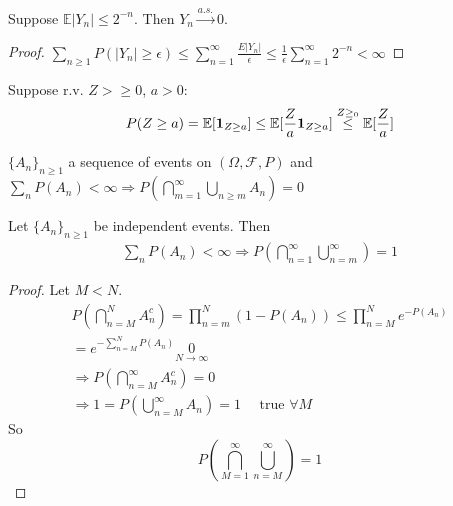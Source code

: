\documentclass[11pt]{article}
\begin{document}
\begin{example}
    Suppose $\mathbb{E}|Y_n| \le 2^{-n}$. Then $Y_n \xrightarrow{a.s.}0$.
    \begin{proof}
        $\sum_{n\ge 1}P(|Y_n|\ge \epsilon) \le \sum_{n=1}^{\infty}\frac{E|Y_n|}{\epsilon}
        \le \frac{1}{\epsilon} \sum_{n=1}^{\infty}2^{-n} < \infty$
    \end{proof}
\end{example}
\begin{remark}
    Suppose r.v. $Z > \ge 0$, $a>0$:
    \begin{align*}
        P(Z \ge a) = \mathbb{E}[\bm{1}_{Z\ge a}]\le \mathbb{E}[\frac{Z}{a}\bm{1}_{Z\ge a}] \overset{Z\ge_0}{\le}
        \mathbb{E}[\frac{Z}{a}] 
    \end{align*}
\end{remark}

\begin{lemma}
    $\{ A_n \}_{n\ge 1}$ a sequence of events on $(\Omega, \mathcal{F}, P)$ and $
    \sum_{n}P(A_n) < \infty \Longrightarrow P(\bigcap_{m=1}^{\infty}\bigcup_{n\ge m} A_n) = 0$
\end{lemma}

\begin{lemma}
    Let $\{ A_n \}_{n\ge 1}$ be independent events. Then 
    \begin{align*}
        \sum_{n}P(A_n) < \infty \Longrightarrow P(\bigcap_{n=1}^{\infty}\bigcup_{n=m}^{\infty}) = 1
    \end{align*}
\end{lemma}

\begin{proof}
    Let $M < N$. 
    \begin{align*}
        P(\bigcap_{n=M}^{N}A_{n}^{c}) = \prod_{n=m}^{N} (1-P(A_n)) \le \prod_{n=M}^{N} e^{-P(A_n)}\\
        = e^{-\sum_{n=M}^{N}P(A_n)} \underset{N \to \infty}{0}\\
        \Longrightarrow P(\bigcap_{n=M}^{\infty}A_n^{c}) = 0\\
        \Longrightarrow 1= P(\bigcup_{n=M}^{\infty}A_n) = 1 \quad \text{ true } \forall M
    \end{align*}
    So 
    \begin{equation}
        P(\bigcap_{M=1}^{\infty}\bigcup_{n=M}^{\infty}) = 1
    \end{equation}
\end{proof}
\end{document}
